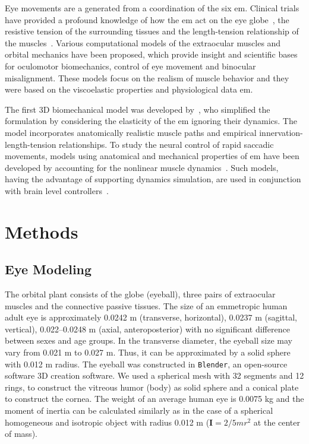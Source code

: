 \documentclass[11pt,a4paper,draft=false]{report}
\newcommand{\mat}[1]{\bm{#1}}
\begin{document}
Eye movements are a generated from a coordination of the six \gls{em}. Clinical
trials have provided a profound knowledge of how the \gls{em} act on the eye
globe~\cite{Robinson1969a}, the resistive tension of the surrounding tissues and
the length-tension relationship of the muscles~\cite{Collins1981}. Various
computational models of the extraocular muscles and orbital mechanics have been
proposed, which provide insight and scientific bases for oculomotor
biomechanics, control of eye movement and binocular misalignment. These models
focus on the realism of muscle behavior and they were based on the viscoelastic
properties and physiological data \gls{em}.

The first 3D biomechanical model was developed by~\cite{Robinson1964a,
  Robinson1969}, who simplified the formulation by considering the elasticity of
the \gls{em} ignoring their dynamics. The model incorporates anatomically
realistic muscle paths and empirical innervation-length-tension
relationships. To study the neural control of rapid saccadic movements, models
using anatomical and mechanical properties of \gls{em} have been developed by
accounting for the nonlinear muscle dynamics~\cite{Thelen2003a,
  Millard2013}. Such models, having the advantage of supporting dynamics
simulation, are used in conjunction with brain level
controllers~\cite{James2018}.

\section*{Methods}\label{sec:methods}

\subsection*{Eye Modeling}\label{sec:eye-Modeling}

The orbital plant consists of the globe (eyeball), three pairs of extraocular
muscles and the connective passive tissues. The size of an emmetropic human
adult eye is approximately 0.0242 m (transverse, horizontal), 0.0237 m
(sagittal, vertical), 0.022–0.0248 m (axial, anteroposterior) with no
significant difference between sexes and age groups. In the transverse diameter,
the eyeball size may vary from 0.021 m to 0.027 m. Thus, it can be approximated
by a solid sphere with 0.012 m radius. The eyeball was constructed in
\texttt{Blender}, an open-source software 3D creation software. We used a
spherical mesh with 32 segments and 12 rings, to construct the vitreous humor
(body) as solid sphere and a conical plate to construct the cornea. The weight
of an average human eye is 0.0075 kg and the moment of inertia can be calculated
similarly as in the case of a spherical homogeneous and isotropic object with
radius 0.012 m ($\mat{I} = 2/5 m r^2$ at the center of mass).
\end{document}

